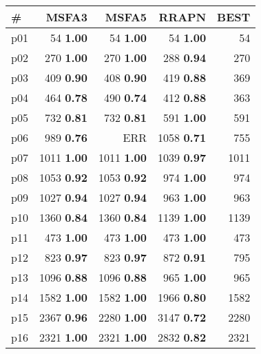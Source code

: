 \begin{tabular}{|l|rrr|r|}
\hline
\textbf{\#} & \textbf{MSFA3} & \textbf{MSFA5} & \textbf{RRAPN} & \textbf{BEST}\\
\hline
p01 & {\footnotesize 54} \textbf{1.00} & {\footnotesize 54} \textbf{1.00} & {\footnotesize 54} \textbf{1.00} & 54\\
p02 & {\footnotesize 270} \textbf{1.00} & {\footnotesize 270} \textbf{1.00} & {\footnotesize 288} \textbf{0.94} & 270\\
p03 & {\footnotesize 409} \textbf{0.90} & {\footnotesize 408} \textbf{0.90} & {\footnotesize 419} \textbf{0.88} & 369\\
p04 & {\footnotesize 464} \textbf{0.78} & {\footnotesize 490} \textbf{0.74} & {\footnotesize 412} \textbf{0.88} & 363\\
p05 & {\footnotesize 732} \textbf{0.81} & {\footnotesize 732} \textbf{0.81} & {\footnotesize 591} \textbf{1.00} & 591\\
p06 & {\footnotesize 989} \textbf{0.76} & ERR & {\footnotesize 1058} \textbf{0.71} & 755\\
p07 & {\footnotesize 1011} \textbf{1.00} & {\footnotesize 1011} \textbf{1.00} & {\footnotesize 1039} \textbf{0.97} & 1011\\
p08 & {\footnotesize 1053} \textbf{0.92} & {\footnotesize 1053} \textbf{0.92} & {\footnotesize 974} \textbf{1.00} & 974\\
p09 & {\footnotesize 1027} \textbf{0.94} & {\footnotesize 1027} \textbf{0.94} & {\footnotesize 963} \textbf{1.00} & 963\\
p10 & {\footnotesize 1360} \textbf{0.84} & {\footnotesize 1360} \textbf{0.84} & {\footnotesize 1139} \textbf{1.00} & 1139\\
p11 & {\footnotesize 473} \textbf{1.00} & {\footnotesize 473} \textbf{1.00} & {\footnotesize 473} \textbf{1.00} & 473\\
p12 & {\footnotesize 823} \textbf{0.97} & {\footnotesize 823} \textbf{0.97} & {\footnotesize 872} \textbf{0.91} & 795\\
p13 & {\footnotesize 1096} \textbf{0.88} & {\footnotesize 1096} \textbf{0.88} & {\footnotesize 965} \textbf{1.00} & 965\\
p14 & {\footnotesize 1582} \textbf{1.00} & {\footnotesize 1582} \textbf{1.00} & {\footnotesize 1966} \textbf{0.80} & 1582\\
p15 & {\footnotesize 2367} \textbf{0.96} & {\footnotesize 2280} \textbf{1.00} & {\footnotesize 3147} \textbf{0.72} & 2280\\
p16 & {\footnotesize 2321} \textbf{1.00} & {\footnotesize 2321} \textbf{1.00} & {\footnotesize 2832} \textbf{0.82} & 2321\\

\end{tabular}
